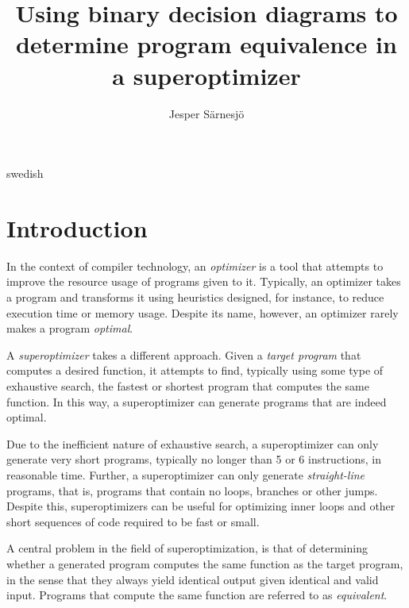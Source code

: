 \documentclass[a4paper,11pt]{kth-mag}
\title{Using binary decision diagrams to determine program equivalence in a superoptimizer}
\subtitle{}
\author{Jesper Särnesjö}
\date{}
\begin{document}
\frontmatter

\pagestyle{empty}

\removepagenumbers

\maketitle


\begin{abstract}
\end{abstract}

\clearpage

\begin{foreignabstract}{swedish}
\end{foreignabstract}

\clearpage

\tableofcontents*

\mainmatter

\pagestyle{newchap}

\chapter{Introduction}
\label{ch:introduction}

In the context of compiler technology, an \emph{optimizer} is a tool that attempts to improve the resource usage of programs given to it.
Typically, an optimizer takes a program and transforms it using heuristics designed, for instance, to reduce execution time or memory usage.
Despite its name, however, an optimizer rarely makes a program \emph{optimal}.

A \emph{superoptimizer} takes a different approach.
Given a \emph{target program} that computes a desired function, it attempts to find, typically using some type of exhaustive search, the fastest or shortest program that computes the same function.
In this way, a superoptimizer can generate programs that are indeed optimal.

Due to the inefficient nature of exhaustive search, a superoptimizer can only generate very short programs, typically no longer than 5 or 6 instructions, in reasonable time.
Further, a superoptimizer can only generate \emph{straight-line} programs, that is, programs that contain no loops, branches or other jumps.
Despite this, superoptimizers can be useful for optimizing inner loops and other short sequences of code required to be fast or small.

A central problem in the field of superoptimization, is that of determining whether a generated program computes the same function as the target program, in the sense that they always yield identical output given identical and valid input.
Programs that compute the same function are referred to as \emph{equivalent}.
\end{document}
